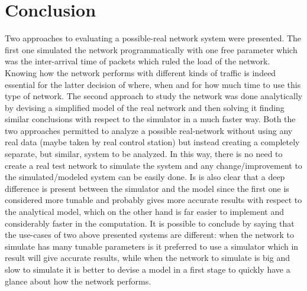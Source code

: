 \documentclass[conference]{IEEEtran}
\begin{document}
\section{Conclusion}\label{sec:conclusion}
Two approaches to evaluating a possible-real network system were presented. The first one simulated the network programmatically with one free parameter which was the inter-arrival time of packets which ruled the load of the network. Knowing how the network performs with different kinds of traffic is indeed essential for the latter decision of where, when and for how much time to use this type of network. The second approach to study the network was done analytically by devising a simplified model of the real network and then solving it finding similar conclusions with respect to the simulator in a much faster way. Both the two approaches permitted to analyze a possible real-network without using any real data (maybe taken by real control station) but instead creating a completely separate, but similar, system to be analyzed. In this way, there is no need to create a real test network to simulate the system and any change/improvement to the simulated/modeled system can be easily done. Is is also clear that a deep difference is present between the simulator and the model since the first one is considered more tunable and probably gives more accurate results with respect to the analytical model, which on the other hand is far easier to implement and considerably faster in the computation. It is possible to conclude by saying that the use-cases of two above presented systems are different: when the network to simulate has many tunable parameters is it preferred to use a simulator which in result will give accurate results, while when the network to simulate is big  and slow to simulate it is better to devise a model in a first stage to quickly have a glance about how the network performs.
\end{document}
